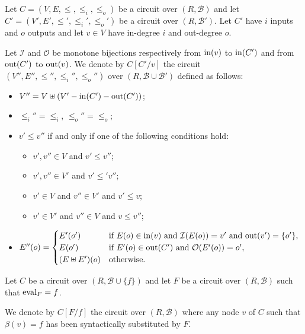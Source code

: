 \begin{definition}
  \label{def:syntax-subst}
  Let $C=(V,E,\le,\le_i,\le_o)$ be a circuit over $(R,\mathcal{B})$
  and let $C'=(V',E',\le',\le_i',\le_o')$ be a circuit over
  $(R,\mathcal{B}')$. Let $C'$ have $i$ inputs and $o$ outputs and let
  $v\in V$ have in-degree $i$ and out-degree $o$.

  Let $\mathcal{I}$ and $\mathcal{O}$ be monotone bijections
  respectively from $\operatorname{in}(v)$ to $\operatorname{in}(C')$ and from $\operatorname{out}(C')$ to
  $\operatorname{out}(v)$. We denote by $C[C'/v]$ the circuit
  $(V'',E'',\le'',\le_i'',\le_o'')$ over
  $(R,\mathcal{B}\cup\mathcal{B}')$ defined as follows:
  \begin{itemize}
  \item $V'' = V\uplus (V' - \operatorname{in}(C') - \operatorname{out}(C'))$;
  \item $\le_i''=\le_i$, $\le_o''=\le_o$;
  \item $v'\le v''$ if and only if one of the following conditions hold:
    \begin{itemize}
    \item $v',v''\in V$ and $v'\le v''$;
    \item $v',v''\in V'$ and $v'\le' v''$;
    \item $v'\in V$ and $v''\in V'$ and $v'\le v$;
    \item $v'\in V'$ and $v''\in V$ and $v\le v''$;
    \end{itemize}
  \item $E''(o) = \begin{cases}
      E'(o') & \text{if $E(o)\in\operatorname{in}(v)$ and $\mathcal{I}(E(o))=v'$ and $\operatorname{out}(v')=\{o'\}$,}\\
      E(o') & \text{if $E'(o)\in\operatorname{out}(C')$ and $\mathcal{O}(E'(o))=o'$,}\\
      (E\uplus E')(o) & \text{otherwise.}
    \end{cases}$
  \end{itemize}
\end{definition}

\begin{definition}
  \label{def:sem-subst}
  Let $C$ be a circuit over $(R,\mathcal{B}\cup\{f\})$ and let $F$ be
  a circuit over $(R,\mathcal{B})$ such that $\operatorname{eval}_F=f$.

  We denote by $C[F/f]$ the circuit over $(R,\mathcal{B})$ where any
  node $v$ of $C$ such that $\beta(v)=f$ has been syntactically
  substituted by $F$.
\end{definition}

